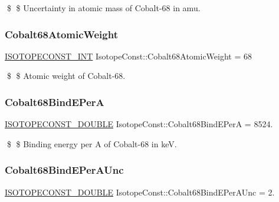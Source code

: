 \$ \$ Uncertainty in atomic mass of Cobalt-\/68 in amu. \mbox{\label{group___isotope_const-_cobalt-_co68_ga0084054260e533925f6d43c7c1bdac03}} 
\subsubsection{\texorpdfstring{Cobalt68\+Atomic\+Weight}{Cobalt68AtomicWeight}}
{\footnotesize\ttfamily \mbox{\hyperlink{group___isotope_const-_macros_ga5f18360b3e99483a35c32d789e62621c}{I\+S\+O\+T\+O\+P\+E\+C\+O\+N\+S\+T\+\_\+\+I\+NT}} Isotope\+Const\+::\+Cobalt68\+Atomic\+Weight = 68}

\$ \$ Atomic weight of Cobalt-\/68. \mbox{\label{group___isotope_const-_cobalt-_co68_gaf442b3a0870e26997ffc999ce08f2416}} 
\subsubsection{\texorpdfstring{Cobalt68\+Bind\+E\+PerA}{Cobalt68BindEPerA}}
{\footnotesize\ttfamily \mbox{\hyperlink{group___isotope_const-_macros_ga8f45a7272ce02c0b4c65c44636ed719a}{I\+S\+O\+T\+O\+P\+E\+C\+O\+N\+S\+T\+\_\+\+D\+O\+U\+B\+LE}} Isotope\+Const\+::\+Cobalt68\+Bind\+E\+PerA = 8524.}

\$ \$ Binding energy per A of Cobalt-\/68 in keV. \mbox{\label{group___isotope_const-_cobalt-_co68_ga1ab2dc6caa7b76b76a9dbd4c5d78ebc4}} 
\subsubsection{\texorpdfstring{Cobalt68\+Bind\+E\+Per\+A\+Unc}{Cobalt68BindEPerAUnc}}
{\footnotesize\ttfamily \mbox{\hyperlink{group___isotope_const-_macros_ga8f45a7272ce02c0b4c65c44636ed719a}{I\+S\+O\+T\+O\+P\+E\+C\+O\+N\+S\+T\+\_\+\+D\+O\+U\+B\+LE}} Isotope\+Const\+::\+Cobalt68\+Bind\+E\+Per\+A\+Unc = 2.}

